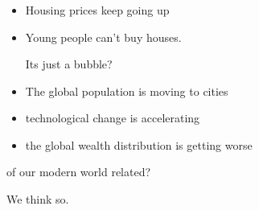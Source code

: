 \documentclass[notes]{beamer}
\begin{document}
\begin{frame}\frametitle{}

\begin{itemize}
\item Housing prices keep going up
\item Young people can't buy houses.\vspace{.5cm}

\hspace{2cm} {\Large Its just a bubble? } \vspace{.5cm}\pause

\item The global population is moving to cities

\item technological change is accelerating
\item the global wealth  distribution is getting worse

\end{itemize}\vspace{.5cm}

\hspace{2cm}{\Large Are all these economic features }

\hspace{2cm} {\Large of our modern world related?}\vspace{.5cm}\pause

\hspace{6cm}We think so.

\end{frame}
\end{document}
